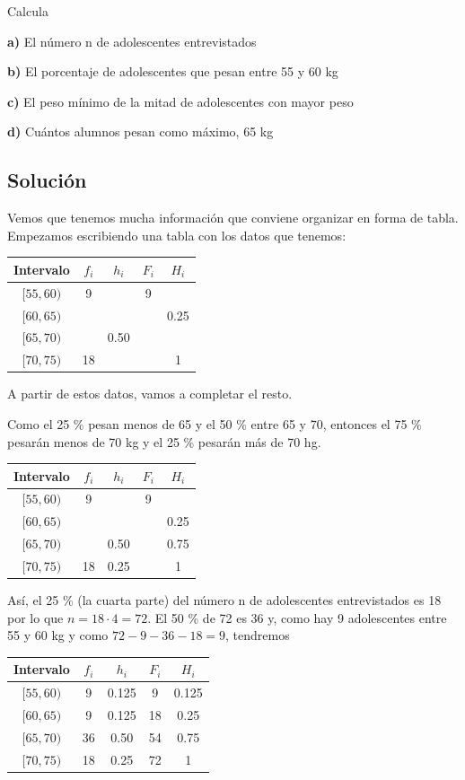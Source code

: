 \documentclass[
]{book}
\begin{document}
Calcula

\textbf{a)} El número n de adolescentes entrevistados

\textbf{b)} El porcentaje de adolescentes que pesan entre 55 y 60 kg

\textbf{c)} El peso mínimo de la mitad de adolescentes con mayor peso

\textbf{d) } Cuántos alumnos pesan como máximo, 65 kg

\hypertarget{soluciuxf3n-2}{%
\subsection{Solución}\label{soluciuxf3n-2}}

Vemos que tenemos mucha información que conviene organizar en forma de tabla. Empezamos escribiendo una tabla con los datos que tenemos:

\begin{longtable}[]{@{}ccccc@{}}
\toprule
Intervalo & \(f_i\) & \(h_i\) & \(F_i\) & \(H_i\)\tabularnewline
\midrule
\endhead
\([55,60)\) & 9 & & 9 &\tabularnewline
\([60,65)\) & & & & 0.25\tabularnewline
\([65,70)\) & & 0.50 & &\tabularnewline
\([70,75)\) & 18 & & & 1\tabularnewline
\bottomrule
\end{longtable}

A partir de estos datos, vamos a completar el resto.

Como el 25 \% pesan menos de 65 y el 50 \% entre 65 y 70, entonces el 75 \% pesarán menos de 70 kg y el 25 \% pesarán más de 70 hg.

\begin{longtable}[]{@{}ccccc@{}}
\toprule
Intervalo & \(f_i\) & \(h_i\) & \(F_i\) & \(H_i\)\tabularnewline
\midrule
\endhead
\([55,60)\) & 9 & & 9 &\tabularnewline
\([60,65)\) & & & & 0.25\tabularnewline
\([65,70)\) & & 0.50 & & 0.75\tabularnewline
\([70,75)\) & 18 & 0.25 & & 1\tabularnewline
\bottomrule
\end{longtable}

Así, el 25 \% (la cuarta parte) del número n de adolescentes entrevistados es 18 por lo que \(n = 18 \cdot 4 = 72\). El 50 \% de 72 es 36 y, como hay 9 adolescentes entre 55 y 60 kg y como \(72 - 9 - 36 - 18 = 9\), tendremos

\begin{longtable}[]{@{}ccccc@{}}
\toprule
Intervalo & \(f_i\) & \(h_i\) & \(F_i\) & \(H_i\)\tabularnewline
\midrule
\endhead
\([55,60)\) & 9 & 0.125 & 9 & 0.125\tabularnewline
\([60,65)\) & 9 & 0.125 & 18 & 0.25\tabularnewline
\([65,70)\) & 36 & 0.50 & 54 & 0.75\tabularnewline
\([70,75)\) & 18 & 0.25 & 72 & 1\tabularnewline
\bottomrule
\end{longtable}
\end{document}
